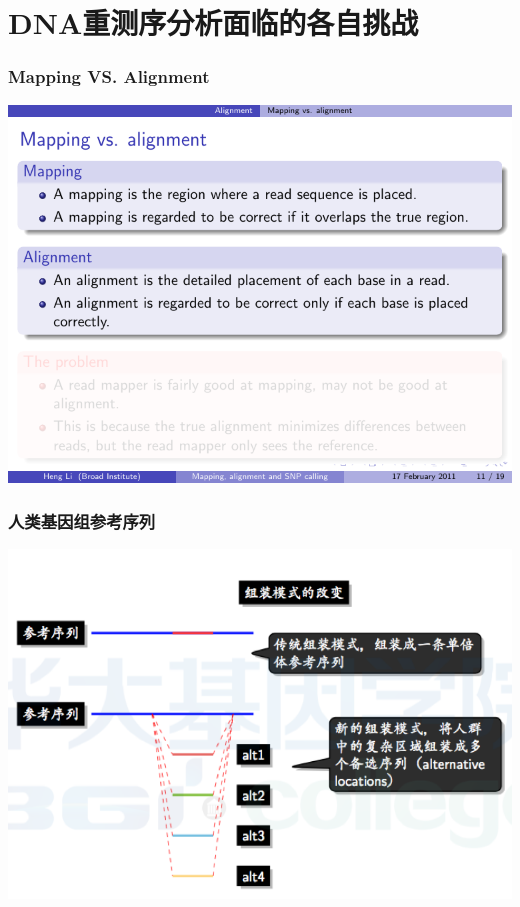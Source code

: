 \documentclass[12pt]{beamer}
\begin{document}
\section{DNA重测序分析面临的各自挑战}
\begin{frame}\frametitle{Mapping VS. Alignment}
  \includegraphics[width=\textwidth]{figures/mappingalign.pdf}  
\end{frame}
\begin{frame}\frametitle{人类基因组参考序列}
  \includegraphics[width=\textwidth]{figures/old_slides/humanref.png}  
\end{frame}
\end{document}

